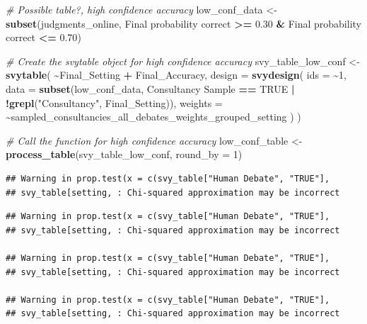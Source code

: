 \documentclass[
]{article}
\newenvironment{Shaded}{\begin{snugshade}}{\end{snugshade}}
\newcommand{\AttributeTok}[1]{\textcolor[rgb]{0.13,0.29,0.53}{#1}}
\newcommand{\CommentTok}[1]{\textcolor[rgb]{0.56,0.35,0.01}{\textit{#1}}}
\newcommand{\ConstantTok}[1]{\textcolor[rgb]{0.56,0.35,0.01}{#1}}
\newcommand{\DecValTok}[1]{\textcolor[rgb]{0.00,0.00,0.81}{#1}}
\newcommand{\FloatTok}[1]{\textcolor[rgb]{0.00,0.00,0.81}{#1}}
\newcommand{\FunctionTok}[1]{\textcolor[rgb]{0.13,0.29,0.53}{\textbf{#1}}}
\newcommand{\NormalTok}[1]{#1}
\newcommand{\OtherTok}[1]{\textcolor[rgb]{0.56,0.35,0.01}{#1}}
\newcommand{\SpecialCharTok}[1]{\textcolor[rgb]{0.81,0.36,0.00}{\textbf{#1}}}
\newcommand{\StringTok}[1]{\textcolor[rgb]{0.31,0.60,0.02}{#1}}
\begin{document}
\begin{Shaded}
\begin{Highlighting}[]
\CommentTok{\# Possible table?, high confidence accuracy}
\NormalTok{low\_conf\_data }\OtherTok{\textless{}{-}} \FunctionTok{subset}\NormalTok{(judgments\_online, }
                         \StringTok{\textasciigrave{}}\AttributeTok{Final probability correct}\StringTok{\textasciigrave{}} \SpecialCharTok{\textgreater{}=} \FloatTok{0.30} \SpecialCharTok{\&} \StringTok{\textasciigrave{}}\AttributeTok{Final probability correct}\StringTok{\textasciigrave{}} \SpecialCharTok{\textless{}=} \FloatTok{0.70}\NormalTok{)}

\CommentTok{\# Create the svytable object for high confidence accuracy}
\NormalTok{svy\_table\_low\_conf }\OtherTok{\textless{}{-}} \FunctionTok{svytable}\NormalTok{(}
  \SpecialCharTok{\textasciitilde{}}\NormalTok{Final\_Setting }\SpecialCharTok{+}\NormalTok{ Final\_Accuracy, }
  \AttributeTok{design =} \FunctionTok{svydesign}\NormalTok{(}
    \AttributeTok{ids =} \SpecialCharTok{\textasciitilde{}}\DecValTok{1}\NormalTok{, }
    \AttributeTok{data =} \FunctionTok{subset}\NormalTok{(low\_conf\_data, }\StringTok{\textasciigrave{}}\AttributeTok{Consultancy Sample}\StringTok{\textasciigrave{}} \SpecialCharTok{==} \ConstantTok{TRUE} \SpecialCharTok{|} \SpecialCharTok{!}\FunctionTok{grepl}\NormalTok{(}\StringTok{"Consultancy"}\NormalTok{, Final\_Setting)),}
    \AttributeTok{weights =} \SpecialCharTok{\textasciitilde{}}\NormalTok{sampled\_consultancies\_all\_debates\_weights\_grouped\_setting}
\NormalTok{  )}
\NormalTok{)}

\CommentTok{\# Call the function for high confidence accuracy}
\NormalTok{low\_conf\_table }\OtherTok{\textless{}{-}} \FunctionTok{process\_table}\NormalTok{(svy\_table\_low\_conf, }\AttributeTok{round\_by =} \DecValTok{1}\NormalTok{)}
\end{Highlighting}
\end{Shaded}

\begin{verbatim}
## Warning in prop.test(x = c(svy_table["Human Debate", "TRUE"],
## svy_table[setting, : Chi-squared approximation may be incorrect
\end{verbatim}

\begin{verbatim}
## Warning in prop.test(x = c(svy_table["Human Debate", "TRUE"],
## svy_table[setting, : Chi-squared approximation may be incorrect

## Warning in prop.test(x = c(svy_table["Human Debate", "TRUE"],
## svy_table[setting, : Chi-squared approximation may be incorrect

## Warning in prop.test(x = c(svy_table["Human Debate", "TRUE"],
## svy_table[setting, : Chi-squared approximation may be incorrect
\end{verbatim}
\end{document}

